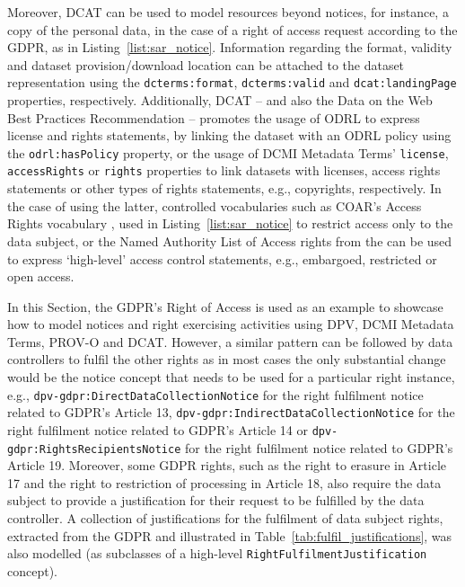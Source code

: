 Moreover, DCAT \citep{albertoni_data_2020} can be used to model resources beyond notices, for instance, a copy of the personal data, in the case of a right of access request according to the GDPR, as in Listing~\ref{list:sar_notice}.
Information regarding the format, validity and dataset provision/download location can be attached to the dataset representation using the \texttt{dcterms:format}, \texttt{dcterms:valid} and \texttt{dcat:landingPage} properties, respectively.
Additionally, DCAT -- and also the Data on the Web Best Practices Recommendation \citep{loscio_data_2017} -- promotes the usage of ODRL to express license and rights statements, by linking the dataset with an ODRL policy using the \texttt{odrl:hasPolicy} property, or the usage of DCMI Metadata Terms' \texttt{license}, \texttt{accessRights} or \texttt{rights} properties to link datasets with licenses, access rights statements or other types of rights statements, e.g., copyrights, respectively.
In the case of using the latter, controlled vocabularies such as COAR's Access Rights vocabulary \citep{apollaro_controlled_2022}, used in Listing~\ref{list:sar_notice} to restrict access only to the data subject, or the Named Authority List of Access rights from the \cite{publications_office_of_the_european_union_named_2023} can be used to express `high-level' access control statements, e.g., embargoed, restricted or open access.

In this Section, the GDPR's Right of Access is used as an example to showcase how to model notices and right exercising activities using DPV, DCMI Metadata Terms, PROV-O and DCAT.
However, a similar pattern can be followed by data controllers to fulfil the other rights as in most cases the only substantial change would be the notice concept that needs to be used for a particular right instance, e.g., \texttt{dpv-gdpr:DirectDataCollectionNotice} for the right fulfilment notice related to GDPR's Article 13, \texttt{dpv-gdpr:IndirectDataCollectionNotice} for the right fulfilment notice related to GDPR's Article 14 or \texttt{dpv-gdpr:RightsRecipientsNotice} for the right fulfilment notice related to GDPR's Article 19.
Moreover, some GDPR rights, such as the right to erasure in Article 17 and the right to restriction of processing in Article 18, also require the data subject to provide a justification for their request to be fulfilled by the data controller.
A collection of justifications for the fulfilment of data subject rights, extracted from the GDPR and illustrated in Table~\ref{tab:fulfil_justifications}, was also modelled (as subclasses of a high-level \texttt{RightFulfilmentJustification} concept). %

